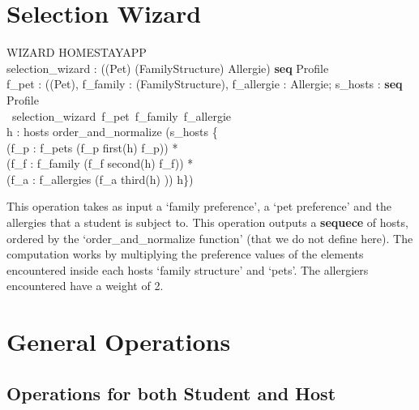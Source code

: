 \documentclass[11pt]{article}
\begin{document}
\section*{Selection Wizard}

\begin{schema}{WIZARD}
	\Xi HOMESTAYAPP\\
	selection\_wizard : (\power (\nat \rightarrow Pet) \cross \power (\nat \rightarrow FamilyStructure) \cross \power Allergie) \rightarrow \textbf{seq} Profile\\
\where
	\forall f\_pet : (\power (\nat \rightarrow Pet), f\_family : \power (\nat \rightarrow FamilyStructure), f\_allergie : \power Allergie; s\_hosts : \textbf{seq} Profile\\
	\bullet\ selection\_wizard\ f\_pet\ f\_family\ f\_allergie\ \Leftrightarrow\\
	\forall h : hosts \bullet order\_and\_normalize (s\_hosts \cup \{\\
					\indent	(\forall f\_p : f\_pets \bullet (\ran f\_p \in first(\ran h) \wedge \dom f\_p)) *\\
					\indent	(\forall f\_f : f\_family \bullet (\ran f\_f \in second(\ran h) \wedge \dom f\_f)) *\\
					\indent	(\forall f\_a : f\_allergies \bullet (\ran f\_a \in third(\ran h) )) \mapsto h\})

\end{schema}
This operation takes as input a `family preference', a `pet preference' and the allergies that a student is subject to. This operation outputs a \textbf{sequece} of hosts, ordered by the `order\_and\_normalize function' (that we do not define here). The computation works by multiplying the preference values of the elements encountered inside each hosts `family structure' and `pets'. The allergiers encountered have a weight of 2.

\section*{General Operations}

\subsection*{Operations for both Student and Host}
\end{document}
